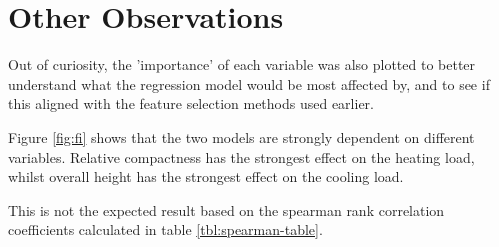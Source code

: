 \documentclass[12pt]{article}
\begin{document}
\section{Other Observations}

Out of curiosity, the 'importance' of each variable was also plotted to better understand what the regression model would be most affected by, and to see if this aligned with the feature selection methods used earlier.

Figure \ref{fig:fi} shows that the two models are strongly dependent on different variables. Relative compactness has the strongest effect on the heating load, whilst overall height has the strongest effect on the cooling load.

This is not the expected result based on the spearman rank correlation coefficients calculated in table \ref{tbl:spearman-table}.
\end{document}
